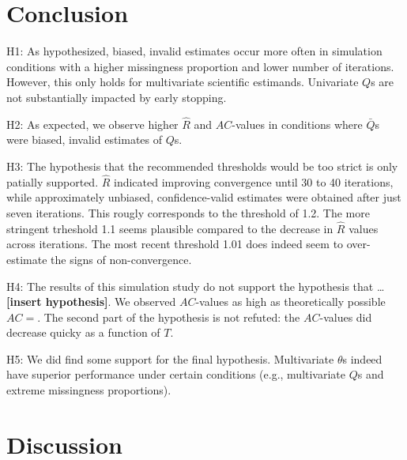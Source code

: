 \documentclass[Royal,times,sageh]{sagej}
\begin{document}
\hypertarget{conclusion}{%
\section{Conclusion}\label{conclusion}}

H1: As hypothesized, biased, invalid estimates occur more often in simulation conditions with a higher missingness proportion and lower number of iterations. However, this only holds for multivariate scientific estimands. Univariate \(Q\)s are not substantially impacted by early stopping.

H2: As expected, we observe higher \(\widehat{R}\) and \(AC\)-values in conditions where \(\bar{Q}\)s were biased, invalid estimates of \(Q\)s.

H3: The hypothesis that the recommended thresholds would be too strict is only patially supported. \(\widehat{R}\) indicated improving convergence until 30 to 40 iterations, while approximately unbiased, confidence-valid estimates were obtained after just seven iterations. This rougly corresponds to the threshold of 1.2. The more stringent trheshold 1.1 seems plausible compared to the decrease in \(\widehat{R}\) values across iterations. The most recent threshold 1.01 does indeed seem to over-estimate the signs of non-convergence.

H4: The results of this simulation study do not support the hypothesis that \ldots{} \textbf{{[}insert hypothesis{]}}. We observed \(AC\)-values as high as theoretically possible \(AC=\). The second part of the hypothesis is not refuted: the \(AC\)-values did decrease quicky as a function of \(T\).

H5: We did find some support for the final hypothesis. Multivariate \(\theta\)s indeed have superior performance under certain conditions (e.g., multivariate \(Q\)s and extreme missingness proportions).

\hypertarget{discussion}{%
\section{Discussion}\label{discussion}}
\end{document}
